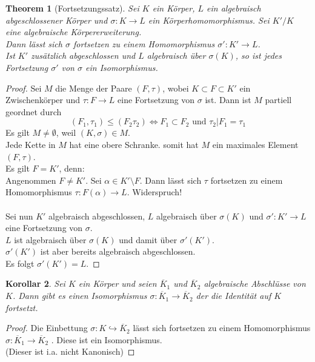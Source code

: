 \documentclass[10pt,a4paper]{article}
\newcommand{\al}{\ensuremath{\alpha}}
\newcommand{\ol}[1]{\overline{#1}}
\theoremstyle{plain}
\newtheorem{theorem}{Theorem}[section]
\newtheorem{kor}[theorem]{Korollar}
\theoremstyle{definition}
\theoremstyle{remark}
\begin{document}
	 \begin{theorem}[Fortsetzungssatz]\label{satz:Fortsetzung}
	 	Sei $K$ ein Körper, $L$ ein algebraisch abgeschlossener Körper und $\sigma:K\to L$ ein Körperhomomorphismus. Sei $K'/K$ eine algebraische Körpererweiterung.\\
	 	Dann lässt sich $\sigma$ fortsetzen zu einem Homomorphismus $\sigma':K'\to L$.\\
	 	Ist $K'$ zusätzlich abgeschlossen und $L$ algebraisch über $\sigma(K)$, so ist jedes Fortsetzung $\sigma'$ von $\sigma$ ein Isomorphismus.
	 \end{theorem}
 	\begin{proof}
 		Sei $M$ die Menge der Paare $(F,\tau)$, wobei $K\subset F\subset K'$ ein Zwischenkörper und $\tau:F\to L$ eine Fortsetzung von $\sigma$ ist. Dann ist $M$ partiell geordnet durch
 		\[(F_1,\tau_1)\leq (F_2\tau_2)\Leftrightarrow F_1\subset F_2\text{ und }\tau_2|F_1=\tau_1\]
 		Es gilt $M\neq\emptyset$, weil $(K,\sigma)\in M$.\\
 		Jede Kette in $M$ hat eine obere Schranke. somit hat $M$ ein maximales Element $(F,\tau)$. \\
 		Es gilt $F=K'$, denn:\\
 		Angenommen $F\neq K'$. Sei $\al\in K'\setminus F$. Dann lässt sich $\tau$ fortsetzen zu einem Homomorphismus $\tau:F(\al)\to L$. Widerspruch!\\
 		\\
 		Sei nun $K'$ algebraisch abgeschlossen, $L$ algebraisch über $\sigma(K)$ und $\sigma':K'\to L$ eine Fortsetzung von $\sigma$.\\
 		$L$ ist algebraisch über $\sigma(K)$ und damit über  $\sigma'(K')$.\\
 		$\sigma'(K')$ ist aber bereits algebraisch abgeschlossen.\\
 		Es folgt $\sigma'(K')=L$.
 	\end{proof}
 
 	\begin{kor}
 		Sei $K$ ein Körper und seien $\ol K_1$ und $\ol K_2$ algebraische Abschlüsse von $K$. Dann gibt es einen Isomorphismus $\sigma:\ol K_1\to \ol K_2$ der die Identität auf $K$ fortsetzt.
 	\end{kor}
 	\begin{proof}
 		Die Einbettung $\sigma:K\hookrightarrow \ol K_2$ lässt sich fortsetzen zu einem Homomorphismus $\sigma:\ol K_1\to\ol K_2$ . Diese ist ein Isomorphismus.\\
 		(Dieser ist i.a. nicht Kanonisch)
 	\end{proof}
 
\end{document}
